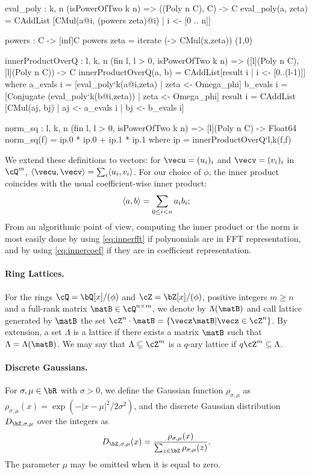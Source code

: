 \begin{code}
  eval_poly : {k, n} (isPowerOfTwo k n) => ((Poly n C), C) -> C
  eval_poly(a, zeta) = CAddList [CMul(a@i, (powers zeta)@i) | i <- [0 .. n]]

  powers : C -> [inf]C
  powers zeta = iterate (\x -> CMul(x,zeta)) (1,0)

  innerProductOverQ : {l, k, n} (fin l, l > 0, isPowerOfTwo k n) =>
    ([l](Poly n C), [l](Poly n C)) -> C
  innerProductOverQ(a, b) = CAddList[result i | i <- [0..(l-1)]] where
    a_evals i = [eval_poly`{k}(a@i,zeta) | zeta <- Omega_phi]
    b_evals i = [Conjugate (eval_poly`{k}(b@i,zeta)) | zeta <- Omega_phi]
    result i = CAddList [CMul(aj, bj) | aj <- a_evals i | bj <- b_evals i]

  norm_sq : {l, k, n} (fin l, l > 0, isPowerOfTwo k n) =>
    [l](Poly n C) -> Float64
  norm_sq(f) = ip.0 * ip.0 + ip.1 * ip.1
    where ip = innerProductOverQ`{l,k}(f,f)
\end{code}

We extend these definitions to vectors: for $\vecu = (u_i)_i$ and $\vecv = (v_i)_i$ in $\cQ^{m}$, $\inner{\vecu}{\vecv} = \sum_i \inner{u_i}{v_i}$.
For our choice of $\phi$, the inner product coincides with the usual coefficient-wise inner product:
\begin{equation}\label{eq:innercoef}
\langle a, b \rangle = \sum_{0 \leq i < n} a_i b_i;
\end{equation}
From an algorithmic point of view, computing the inner product or the norm is most easily done by using \eqref{eq:innerfft} if polynomials are in FFT representation, and by using \eqref{eq:innercoef} if they are in coefficient representation.

\paragraph{Ring Lattices.} For the rings $\cQ = \bQ[x]/(\phi)$ and $\cZ = \bZ[x]/(\phi)$, positive integers $m \geq n$ and a full-rank matrix $\matB \in \cQ^{n\times m}$, we denote by $\Lambda(\matB)$ and call lattice generated by $\matB$ the set $\cZ^n \cdot \matB = \{ \vecz \matB | \vecz \in \cZ^{n}\}$. By extension, a set $\Lambda$ is a lattice if there exists a matrix $\matB$ such that $\Lambda = \Lambda(\matB)$. We may say that $\Lambda \subseteq \cZ^m$ is a $q$-ary lattice if $ q\cZ^m \subseteq \Lambda$.

\paragraph{Discrete Gaussians.} For $\sigma, \mu\in \bR$ with $\sigma >0$, we define the Gaussian function $\rho_{\sigma,\mu}$ as $\rho_{\sigma,\mu}(x) = \exp(-|x-\mu|^2/2\sigma^2)$, and the discrete Gaussian distribution $D_{\bZ,\sigma,\mu}$ over the integers as
\begin{equation}
D_{\bZ,\sigma,\mu}(x) = \frac{\rho_{\sigma,\mu}(x)}{ \sum_{z \in \bZ} \rho_{\sigma,\mu}(z) } .
\end{equation}
The parameter $\mu$ may be omitted when it is equal to zero.

